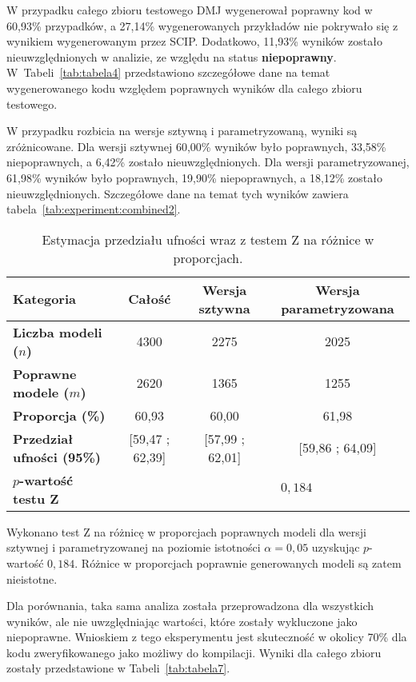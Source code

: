 W przypadku całego zbioru testowego DMJ wygenerował poprawny kod w 60,93\% przypadków, a 27,14\% wygenerowanych przykładów nie pokrywało się z wynikiem wygenerowanym przez SCIP. Dodatkowo, 11,93\% wyników zostało nieuwzględnionych w analizie, ze względu na status \textbf{niepoprawny}. W~Tabeli~\ref{tab:tabela4} przedstawiono szczegółowe dane na temat wygenerowanego kodu względem poprawnych wyników dla całego zbioru testowego.

W przypadku rozbicia na wersje sztywną i parametryzowaną, wyniki są zróżnicowane. Dla wersji sztywnej 60,00\% wyników było poprawnych, 33,58\% niepoprawnych, a 6,42\% zostało nieuwzględnionych. Dla wersji parametryzowanej, 61,98\% wyników było poprawnych, 19,90\% niepoprawnych, a 18,12\% zostało nieuwzględnionych. Szczegółowe dane na temat tych wyników zawiera tabela~\ref{tab:experiment:combined2}.

\begin{table}[H]
\caption{Estymacja przedziału ufności wraz z testem Z na różnice w proporcjach.}\label{tab:experiment:analysis2}
\centering%
\begin{tabular}{|l|c|c|c|}
\hline
\textbf{Kategoria} & \textbf{Całość} & \textbf{Wersja sztywna} & \textbf{Wersja parametryzowana} \\
\hline
\textbf{Liczba modeli ($n$)} & 4300 & 2275 & 2025 \\
\hline
\textbf{Poprawne modele ($m$)} & 2620 & 1365 & 1255 \\
\hline
\textbf{Proporcja (\%)} & 60,93 & 60,00 & 61,98 \\
\hline
\textbf{Przedział ufności (95\%)} & [59,47 ; 62,39] & [57,99 ; 62,01] & [59,86 ; 64,09] \\
\hline
\textbf{$p$-wartość testu Z}&&\multicolumn{2}{c|}{$0,184$}\\
\hline
\end{tabular}
\end{table}

Wykonano test Z na różnicę w proporcjach poprawnych modeli dla wersji sztywnej i parametryzowanej na poziomie istotności $\alpha=0,05$ uzyskując $p$-wartość $0,184$. Różnice w proporcjach poprawnie generowanych modeli są zatem nieistotne.

Dla porównania, taka sama analiza została przeprowadzona dla wszystkich wyników, ale nie uwzględniając wartości, które zostały wykluczone jako niepoprawne. Wnioskiem z tego eksperymentu jest skuteczność w okolicy 70\% dla kodu zweryfikowanego jako możliwy do kompilacji. Wyniki dla całego zbioru zostały przedstawione w Tabeli~\ref{tab:tabela7}.

